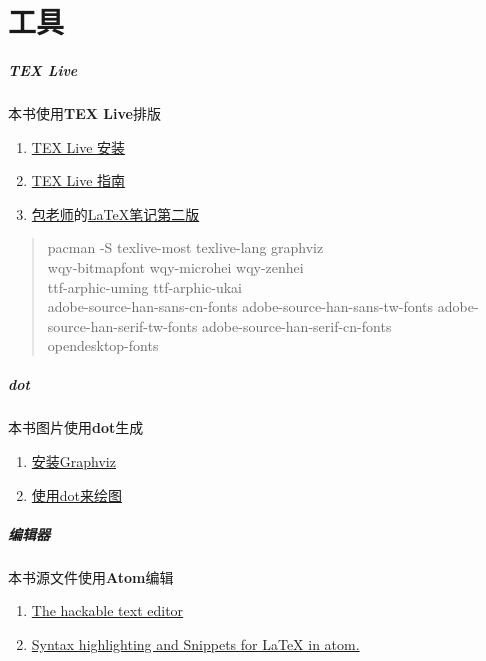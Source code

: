 \chapter{工具}

\paragraph{TEX Live}
本书使用\textbf{TEX Live}排版
\begin{enumerate}
  \item \href{https://wiki.archlinux.org/index.php/TeX_Live_(%E7%AE%80%E4%BD%93%E4%B8%AD%E6%96%87)}{TEX Live 安装}
  \item \href{https://www.tug.org/texlive/doc/texlive-zh-cn/texlive-zh-cn.pdf}{TEX Live 指南}
  \item \href{http://www.dralpha.com/zh/index.htm}{包老师}的\href{http://dralpha.altervista.org/zh/tech/lnotes2.pdf}{LaTeX笔记第二版}
\end{enumerate}

\begin{quote}
  pacman -S texlive-most texlive-lang graphviz \\
  wqy-bitmapfont wqy-microhei wqy-zenhei \\
  ttf-arphic-uming ttf-arphic-ukai \\
  adobe-source-han-sans-cn-fonts adobe-source-han-sans-tw-fonts adobe-source-han-serif-tw-fonts adobe-source-han-serif-cn-fonts \\
  opendesktop-fonts
\end{quote}


\paragraph{dot}
本书图片使用\textbf{dot}生成
\begin{enumerate}
  \item \href{https://wiki.archlinux.org/index.php/Graphviz}{安装Graphviz}
  \item \href{http://www.jianshu.com/p/5b02445eca1d}{使用dot来绘图}
\end{enumerate}

\paragraph{编辑器}
本书源文件使用\textbf{Atom}编辑
\begin{enumerate}
  \item \href{https://github.com/atom/atom}{The hackable text editor}
  \item \href{https://atom.io/packages/language-latex}{Syntax highlighting and Snippets for LaTeX in atom.}
\end{enumerate}
